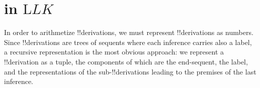 \documentclass[10pt,a4paper]{article}
\theoremstyle{plain}
\theoremstyle{definition}
\theoremstyle{remark}
\newenvironment{explain}{}{}
\newcommand*{\olfileid}[3]{}
\newcommand*{\olsection}[1]{\section*{#1}}
\providecommand{\Log}{\ensuremath{\mathrm{L}}}
\begin{document}



\olfileid{inc}{art}{plk}
\olsection{ in $\Log{LK}$}

\begin{explain}
In order to arithmetize !!{derivation}s, we must represent
!!{derivation}s as numbers. Since !!{derivation}s are trees of sequents
where each inference carries also a label, a recursive
representation is the most obvious approach: we represent a
!!{derivation} as a tuple, the components of which are the
end-sequent, the label, and the representations of the
sub-!!{derivation}s leading to the premises of the last inference.
\end{explain}
\end{document}
